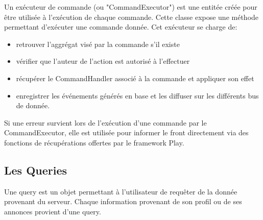 Un exécuteur de commande (ou "CommandExecutor") est une entitée créée pour être utilisée à l'exécution de chaque commande.
Cette classe expose une méthode permettant d'exécuter une commande donnée.
Cet exécuteur se charge de:
\begin{itemize}
  \item retrouver l'aggrégat visé par la commande s'il existe
  \item vérifier que l'auteur de l'action est autorisé à l'effectuer
  \item récupérer le CommandHandler associé à la commande et appliquer son effet
  \item enregistrer les événements générés en base et les diffuser sur les différents bus de donnée.
\end{itemize}
Si une erreur survient lors de l'exécution d'une commande par le CommandExecutor, elle est utilisée pour informer le front directement via des fonctions de récupérations offertes par le framework Play.

\subsection{Les Queries}
\label{sub:Les Queries}
Une query est un objet permettant à l'utilisateur de requêter de la donnée provenant du serveur.
Chaque information provenant de son profil ou de ses annonces provient d'une query.
